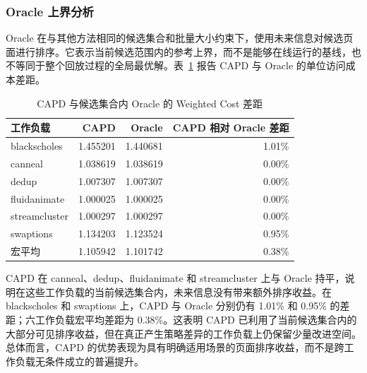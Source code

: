 \subsubsection{\heiti Oracle 上界分析}

Oracle 在与其他方法相同的候选集合和批量大小约束下，使用未来信息对候选页面进行排序。它表示当前候选范围内的参考上界，而不是能够在线运行的基线，也不等同于整个回放过程的全局最优解。表~\ref{tab:capd-oracle-gap} 报告 CAPD 与 Oracle 的单位访问成本差距。

\begin{table}[htbp]
  \centering
  \small
  \caption{CAPD 与候选集合内 Oracle 的 Weighted Cost 差距}
  \label{tab:capd-oracle-gap}
  \renewcommand{\arraystretch}{1.15}
  \setlength{\tabcolsep}{8pt}
  \begin{tabular}{lrrr}
    \toprule
    工作负载 & CAPD & Oracle & CAPD 相对 Oracle 差距 \\
    \midrule
    blackscholes  & 1.455201 & 1.440681 & 1.01\% \\
    canneal       & 1.038619 & 1.038619 & 0.00\% \\
    dedup         & 1.007307 & 1.007307 & 0.00\% \\
    fluidanimate  & 1.000025 & 1.000025 & 0.00\% \\
    streamcluster & 1.000297 & 1.000297 & 0.00\% \\
    swaptions     & 1.134203 & 1.123524 & 0.95\% \\
    \midrule
    宏平均         & 1.105942 & 1.101742 & 0.38\% \\
    \bottomrule
  \end{tabular}
\end{table}

CAPD 在 canneal、dedup、fluidanimate 和 streamcluster 上与 Oracle 持平，说明在这些工作负载的当前候选集合内，未来信息没有带来额外排序收益。在 blackscholes 和 swaptions 上，CAPD 与 Oracle 分别仍有 1.01\% 和 0.95\% 的差距；六工作负载宏平均差距为 0.38\%。这表明 CAPD 已利用了当前候选集合内的大部分可见排序收益，但在真正产生策略差异的工作负载上仍保留少量改进空间。总体而言，CAPD 的优势表现为具有明确适用场景的页面排序收益，而不是跨工作负载无条件成立的普遍提升。
